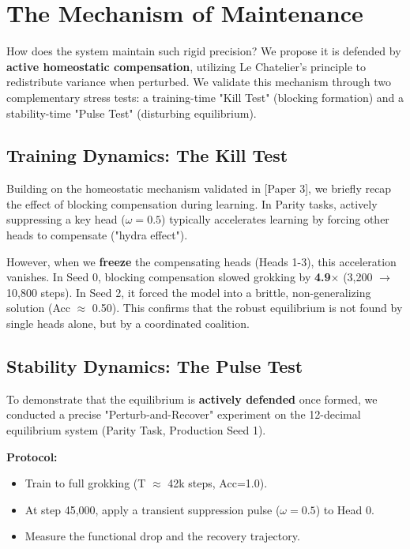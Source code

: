 \section{The Mechanism of Maintenance}\label{sec:mechanism}

How does the system maintain such rigid precision? We propose it is defended by \textbf{active homeostatic compensation}, utilizing Le Chatelier's principle to redistribute variance when perturbed. We validate this mechanism through two complementary stress tests: a training-time "Kill Test" (blocking formation) and a stability-time "Pulse Test" (disturbing equilibrium).

\subsection{Training Dynamics: The Kill Test}
Building on the homeostatic mechanism validated in [Paper 3], we briefly recap the effect of blocking compensation during learning. In Parity tasks, actively suppressing a key head ($\omega=0.5$) typically accelerates learning by forcing other heads to compensate ("hydra effect"). 

However, when we \textbf{freeze} the compensating heads (Heads 1-3), this acceleration vanishes. In Seed 0, blocking compensation slowed grokking by \textbf{4.9$\times$} (3,200 $\to$ 10,800 steps). In Seed 2, it forced the model into a brittle, non-generalizing solution (Acc $\approx$ 0.50). This confirms that the robust equilibrium is not found by single heads alone, but by a coordinated coalition.

\subsection{Stability Dynamics: The Pulse Test}
To demonstrate that the equilibrium is \textbf{actively defended} once formed, we conducted a precise "Perturb-and-Recover" experiment on the 12-decimal equilibrium system (Parity Task, Production Seed 1).

\textbf{Protocol:}
\begin{itemize}
    \item Train to full grokking (T $\approx$ 42k steps, Acc=1.0).
    \item At step 45,000, apply a transient suppression pulse ($\omega=0.5$) to Head 0.
    \item Measure the functional drop and the recovery trajectory.
\end{itemize}


